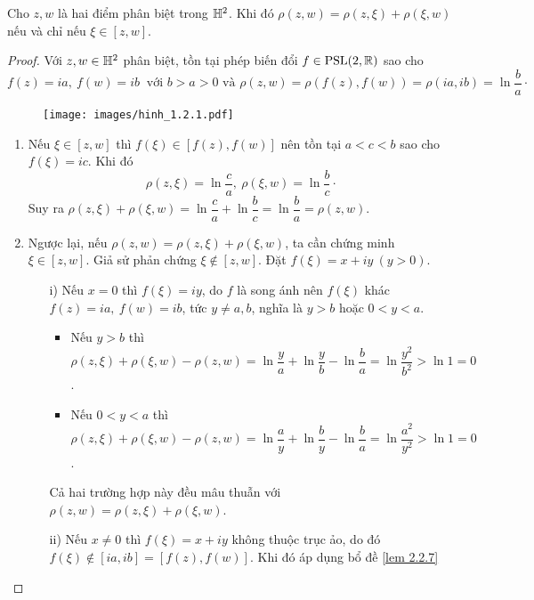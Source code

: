\begin{prop}\label{prop 2.2.8}
    Cho $z,w$ là hai điểm phân biệt trong $\mathbb{H}^2$. Khi đó $\rho(z,w) = \rho(z,\xi) + \rho(\xi,w)$ nếu và chỉ nếu $\xi \in [z,w]$.
\end{prop}
\begin{proof}
    Với $z,w \in \mathbb{H}^2$ phân biệt, tồn tại phép biến đổi $f \in \operatorname{PSL}(2,\mathbb{R})$ sao cho \[f(z) = ia,~f(w)= ib~\text{ với } b>a>0 \text{ và } \rho(z,w) =\rho(f(z),f(w)) =\rho(ia,ib)=\ln{\dfrac{b}{a}}\cdot\]
    \begin{figure}[!htp]
        \centering
        \texttt{[image: images/hinh\_1.2.1.pdf]}
    \end{figure}
    \begin{enumerate}
        \item Nếu $\xi \in [z,w]$ thì $f(\xi) \in [f(z),f(w)]$ nên tồn tại $a<c<b$ sao cho $f(\xi) = ic$. Khi đó 
        \[\rho(z,\xi) = \ln{\dfrac{c}{a}},~\rho(\xi,w) = \ln{\dfrac{b}{c}}\cdot\]
        Suy ra $ \rho(z,\xi) + \rho(\xi,w) = \ln{\dfrac{c}{a}} + \ln{\dfrac{b}{c}} = \ln{\dfrac{b}{a}} = \rho(z,w)$.
        \item Ngược lại, nếu $\rho(z,w) = \rho(z,\xi) + \rho(\xi,w)$, ta cần chứng minh $\xi \in [z,w]$. Giả sử phản chứng $\xi \notin [z,w]$. Đặt $f(\xi) = x+iy~(y>0)$.
        \begin{itemize}
            \item[i)] Nếu $x = 0$ thì $f(\xi) = iy $, do $f$ là song ánh nên $ f(\xi)$ khác $f(z) = ia,~f(w)=ib$, tức $y \neq a,b$, nghĩa là $y > b$ hoặc $0<y<a$. 
            \begin{itemize}
                \item Nếu $y>b$ thì $\rho(z,\xi) + \rho(\xi,w) - \rho(z,w) = \ln{\dfrac{y}{a}} + \ln{\dfrac{y}{b}} - \ln{\dfrac{b}{a}}= \ln{\dfrac{y^2}{b^2}} > \ln{1}=0$.
                \item Nếu $0<y<a$ thì $\rho(z,\xi) + \rho(\xi,w) - \rho(z,w) = \ln{\dfrac{a}{y}} + \ln{\dfrac{b}{y}} - \ln{\dfrac{b}{a}}= \ln{\dfrac{a^2}{y^2}}>\ln{1}=0$.
            \end{itemize}
            Cả hai trường hợp này đều mâu thuẫn với $\rho(z,w) = \rho(z,\xi) + \rho(\xi,w)$.
            \item[ii)] Nếu $x\neq 0$ thì $f(\xi) = x+iy$ không thuộc trục ảo, do đó $f(\xi) \notin [ia,ib]=[f(z),f(w)]$. Khi đó áp dụng bổ đề \ref{lem 2.2.7}
            \begin{itemize}

\end{itemize}
\end{itemize}
\end{enumerate}
\end{proof}
